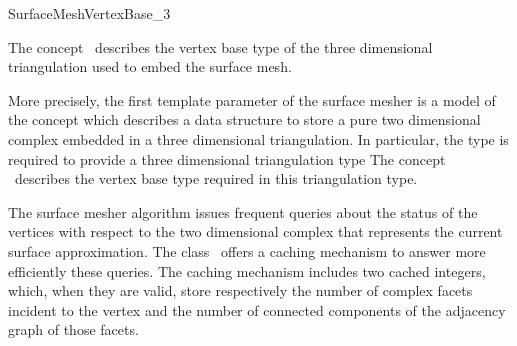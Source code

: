 
\begin{ccRefConcept}{SurfaceMeshVertexBase_3}


\ccDefinition
  
The concept \ccRefName\ describes the vertex base type
of the three dimensional triangulation used
to embed the surface mesh.

More precisely,
the first template parameter  of the surface mesher
is a model of the concept 
which describes a data structure to store
a pure two dimensional complex 
embedded in a three dimensional triangulation.
In particular, the type  is required to provide
a three dimensional triangulation type
The concept \ccRefName\ describes the vertex base type
required in this triangulation type.





\ccGeneralizes



The surface mesher algorithm issues frequent queries
about the status of the vertices  with respect to the
two dimensional complex that represents the current
surface approximation.
The class \ccRefName\ offers a caching mechanism
to answer  more efficiently these queries.
The caching mechanism includes two cached integers, which, when they
are valid, store respectively the number of complex
facets incident to the vertex and the number
of connected components  of the adjacency graph of those facets.









\end{ccRefConcept}
